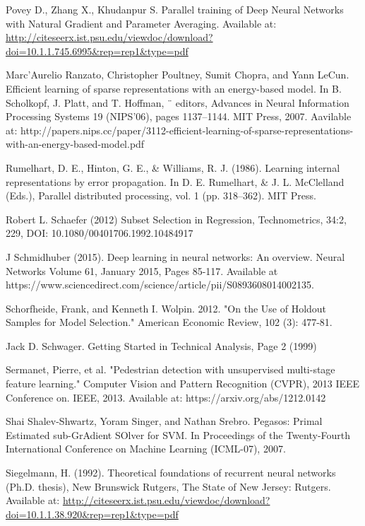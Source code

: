\documentclass[a4paper,11pt,oneside]{article}
\theoremstyle{plain}
\theoremstyle{definition}
\begin{document}
\begin{thebibliography}{bibliography}
Povey D., Zhang X., Khudanpur S. Parallel training of Deep Neural Networks with Natural Gradient and Parameter Averaging. Available at: \url{http://citeseerx.ist.psu.edu/viewdoc/download?doi=10.1.1.745.6995&rep=rep1&type=pdf}

Marc’Aurelio Ranzato, Christopher Poultney, Sumit Chopra, and Yann LeCun. Efficient learning of sparse representations with an energy-based model. In B. Scholkopf, J. Platt, and T. Hoffman, ¨ editors, Advances in Neural Information Processing Systems 19 (NIPS’06), pages 1137–1144. MIT Press, 
2007. Aavilable at: http://papers.nips.cc/paper/3112-efficient-learning-of-sparse-representations-with-an-energy-based-model.pdf

Rumelhart, D. E., Hinton, G. E., \& Williams, R. J. (1986). Learning internal representations by error propagation. In D. E. Rumelhart, \& J. L. McClelland (Eds.), Parallel distributed processing, vol. 1 (pp. 318–362). MIT Press.

Robert L. Schaefer (2012) Subset Selection in Regression, Technometrics, 34:2, 229, DOI: 10.1080/00401706.1992.10484917
  
J Schmidhuber (2015). Deep learning in neural networks: An overview. Neural Networks Volume 61, January 2015, Pages 
85-117. Available at https://www.sciencedirect.com/science/article/pii/S0893608014002135. 
  
Schorfheide, Frank, and Kenneth I. Wolpin. 2012. "On the Use of Holdout Samples for Model Selection." American Economic Review, 102 (3): 477-81.

Jack D. Schwager. Getting Started in Technical Analysis, Page 2 (1999)


Sermanet, Pierre, et al. "Pedestrian detection with unsupervised multi-stage feature learning." Computer Vision and Pattern Recognition (CVPR), 2013 IEEE Conference on. IEEE, 2013.
Available at: https://arxiv.org/abs/1212.0142

Shai Shalev-Shwartz, Yoram Singer, and Nathan Srebro. Pegasos: Primal Estimated sub-GrAdient SOlver for SVM. In Proceedings of the Twenty-Fourth International Conference on Machine Learning (ICML-07), 2007.

Siegelmann, H. (1992). Theoretical foundations of recurrent neural networks (Ph.D. thesis), New Brunswick Rutgers, The State of New Jersey: Rutgers. Available at: \url{http://citeseerx.ist.psu.edu/viewdoc/download?doi=10.1.1.38.920&rep=rep1&type=pdf}


\end{thebibliography}
\end{document}
